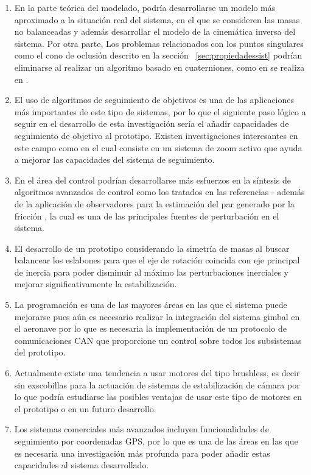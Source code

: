\begin{enumerate}[1.]
\item En la parte te\'{o}rica del modelado, podr\'{i}a desarrollarse un modelo m\'{a}s aproximado a la situaci\'{o}n real del sistema, en el que se consideren las masas no balanceadas y adem\'{a}s desarrollar el modelo de la cinem\'{a}tica inversa del sistema. Por otra parte, Los problemas relacionados con los puntos singulares como el cono de oclusi\'{o}n descrito en la secci\'{o}n ~\ref{sec:propiedadessist} podr\'{i}an eliminarse al realizar un algoritmo basado en cuaterniones, como en se realiza en \cite{7}.

\item El uso de algoritmos de seguimiento de objetivos es una de las aplicaciones m\'{a}s importantes de este tipo de sistemas, por lo que el siguiente paso l\'{o}gico a seguir en el desarrollo de esta investigaci\'{o}n ser\'{i}a el a\~{n}adir capacidades de seguimiento de objetivo al prototipo. Existen investigaciones interesantes en este campo como en \cite{27} el cual consiste en un sistema de zoom activo que ayuda a mejorar las capacidades del sistema de seguimiento.

\item En el \'{a}rea del control podr\'{i}an desarrollarse m\'{a}s esfuerzos en la s\'{i}ntesis de algoritmos avanzados de control como los tratados en las referencias \cite{15}-\cite{18} adem\'{a}s de la aplicaci\'{o}n de observadores para la estimaci\'{o}n del par generado por la fricci\'{o}n \cite{10}, \cite{11} la cual es una de las principales fuentes de perturbaci\'{o}n en el sistema.    

\item El desarrollo de un prototipo considerando la simetr\'{i}a de masas al buscar balancear los eslabones para que el eje de rotaci\'{o}n coincida con eje principal de inercia para poder disminuir al m\'{a}ximo las perturbaciones inerciales y mejorar significativamente la estabilizaci\'{o}n.

\item La programaci\'{o}n es una de las mayores \'{a}reas en las que el sistema puede mejorarse pues a\'{u}n es necesario realizar la integraci\'{o}n del sistema gimbal en el aeronave por lo que es necesaria la implementaci\'{o}n de un protocolo de comunicaciones CAN que proporcione un control sobre todos los subsistemas del prototipo. 

\item Actualmente existe una tendencia a usar motores del tipo brushless, es decir sin exscobillas para la actuaci\'{o}n de sistemas de estabilizaci\'{o}n de c\'{a}mara por lo que podr\'{i}a estudiarse las posibles ventajas de usar este tipo de motores en el prototipo o en un futuro desarrollo. 

\item Los sistemas comerciales m\'{a}s avanzados incluyen funcionalidades de seguimiento por coordenadas GPS, por lo que es una de las \'{a}reas en las que es necesaria una investigaci\'{o}n m\'{a}s profunda para poder a\~{n}adir estas capacidades al sistema desarrollado. 
\end{enumerate}  

